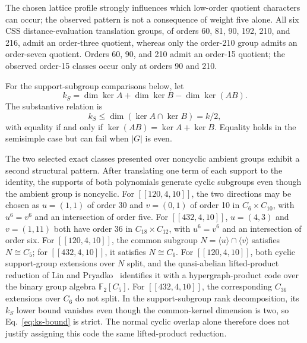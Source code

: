 \documentclass[aps,prx,twocolumn,superscriptaddress,nofootinbib,floatfix]{revtex4-2}
\newcommand{\FF}{\ensuremath{\mathbb{F}}}
\newcommand{\code}[1]{\ensuremath{\left[\!\left[#1\right]\!\right]}}
\begin{document}
The chosen lattice profile strongly influences which low-order quotient
characters can occur; the observed pattern is not a consequence of weight five
alone.  All six CSS
distance-evaluation translation groups, of orders 60, 81, 90, 192, 210, and
216, admit an
order-three quotient, whereas only the order-210 group admits an order-seven
quotient.  Orders 60, 90, and 210 admit an order-15 quotient; the observed
order-15 classes occur only at orders 90 and 210.

For the support-subgroup comparisons below, let
\begin{equation}
k_S=\dim\ker A+\dim\ker B-\dim\ker(AB).
\end{equation}
The substantive relation is
\begin{equation}
k_S\leq\dim(\ker A\cap\ker B)=k/2,
\label{eq:ks-bound}
\end{equation}
with equality if and only if $\ker(AB)=\ker A+\ker B$.  Equality holds in
the semisimple case but can fail when $|G|$ is even.

The two selected exact classes presented over noncyclic ambient groups exhibit
a second structural pattern.
After translating one term of each support to the identity, the supports of both
polynomials generate cyclic subgroups even though the ambient group is
noncyclic.  For $\code{120,4,10}$, the two directions may be chosen as
$u=(1,1)$ of order 30 and $v=(0,1)$ of order 10 in
$C_6\times C_{10}$, with $u^6=v^6$ and an intersection of order five.  For
$\code{432,4,10}$, $u=(4,3)$ and $v=(1,11)$ both have order 36 in
$C_{18}\times C_{12}$, with $u^6=v^6$ and an intersection of order six.
For $\code{120,4,10}$, the common subgroup
$N=\langle u\rangle\cap\langle v\rangle$ satisfies $N\cong C_5$; for
$\code{432,4,10}$, it satisfies $N\cong C_6$.  For $\code{120,4,10}$, both
cyclic support-group extensions
over $N$ split, and the quasi-abelian lifted-product reduction of Lin and
Pryadko~\cite{lin2024twoblock} identifies it with a hypergraph-product code
over the binary group algebra $\FF_2[C_5]$.  For $\code{432,4,10}$, the
corresponding $C_{36}$
extensions over $C_6$ do not split.  In the support-subgroup rank decomposition,
its $k_S$ lower bound vanishes even though the common-kernel dimension is two,
so Eq.~\eqref{eq:ks-bound} is strict.  The normal cyclic overlap alone therefore does not
justify assigning this code the same lifted-product reduction.
\end{document}
